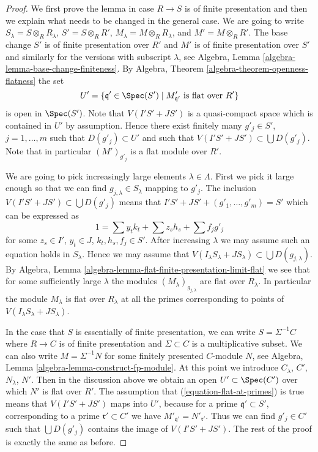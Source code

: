 \begin{proof}
We first prove the lemma in case $R \to S$ is of finite presentation
and then we explain what needs to be changed in the general case.
We are going to write $S_\lambda = S \otimes_R R_\lambda$,
$S' = S \otimes_R R'$, $M_\lambda = M \otimes_R R_\lambda$, and
$M' = M \otimes_R R'$.
The base change $S'$ is of finite presentation over $R'$ and
$M'$ is of finite presentation over $S'$ and similarly for the
versions with subscript $\lambda$, see
Algebra, Lemma \ref{algebra-lemma-base-change-finiteness}.
By
Algebra, Theorem \ref{algebra-theorem-openness-flatness}
the set
$$
U' = \{\mathfrak q' \in \Spec(S') \mid
M'_{\mathfrak q'}\text{ is flat over }R'\}
$$
is open in $\Spec(S')$. Note that $V(I'S' + JS')$
is a quasi-compact space which is contained in $U'$ by assumption.
Hence there exist finitely many $g'_j \in S'$, $j = 1, \ldots, m$
such that $D(g'_j) \subset U'$ and such
that $V(I'S' + JS') \subset \bigcup D(g'_j)$.
Note that in particular $(M')_{g'_j}$ is a flat module over $R'$.

\medskip\noindent
We are going to pick increasingly large elements $\lambda \in \Lambda$.
First we pick it large enough so that we can find
$g_{j, \lambda} \in S_{\lambda}$ mapping to $g'_j$.
The inclusion $V(I'S' + JS') \subset \bigcup D(g'_j)$ means that
$I'S' + JS' + (g'_1, \ldots, g'_m) = S'$ which can be expressed as
$$
1 = \sum y_tk_t + \sum z_sh_s + \sum f_jg'_j
$$
for some $z_s \in I'$, $y_t \in J$, $k_t, h_s, f_j \in S'$.
After increasing $\lambda$ we may assume such an equation holds in
$S_\lambda$. Hence we may assume that
$V(I_\lambda S_\lambda + J S_\lambda) \subset \bigcup D(g_{j, \lambda})$. By
Algebra, Lemma \ref{algebra-lemma-flat-finite-presentation-limit-flat}
we see that for some sufficiently large $\lambda$ the modules
$(M_\lambda)_{g_{j, \lambda}}$ are flat over $R_\lambda$.
In particular the module $M_\lambda$ is flat over $R_\lambda$
at all the primes corresponding to points of
$V(I_\lambda S_\lambda + J S_\lambda)$.

\medskip\noindent
In the case that $S$ is essentially of finite presentation, we can write
$S = \Sigma^{-1}C$ where $R \to C$ is of finite presentation and
$\Sigma \subset C$ is a multiplicative subset. We can also write
$M = \Sigma^{-1}N$ for some finitely presented $C$-module $N$, see
Algebra, Lemma \ref{algebra-lemma-construct-fp-module}.
At this point we introduce $C_\lambda$, $C'$, $N_\lambda$, $N'$. Then in
the discussion above we obtain an open $U' \subset \Spec(C')$
over which $N'$ is flat over $R'$. The assumption that
(\ref{equation-flat-at-primes}) is true means that $V(I'S' + JS')$ maps
into $U'$, because for a prime $\mathfrak q' \subset S'$, corresponding
to a prime $\mathfrak r' \subset C'$ we have
$M'_{\mathfrak q'} = N'_{\mathfrak r'}$. Thus we can find
$g'_j \in C'$ such that $\bigcup D(g'_j)$ contains the image of
$V(I'S' + JS')$. The rest of the proof is exactly the same as before.
\end{proof}

